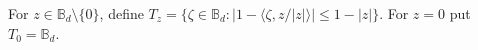 
For $z\in\mathbb B_d\setminus\{0\}$, define $T_z=\{\zeta\in\mathbb B_d:|1-\langle\zeta,z/|z|\rangle|\le1-|z|\}$. For $z=0$ put $T_0=\mathbb B_d$.
